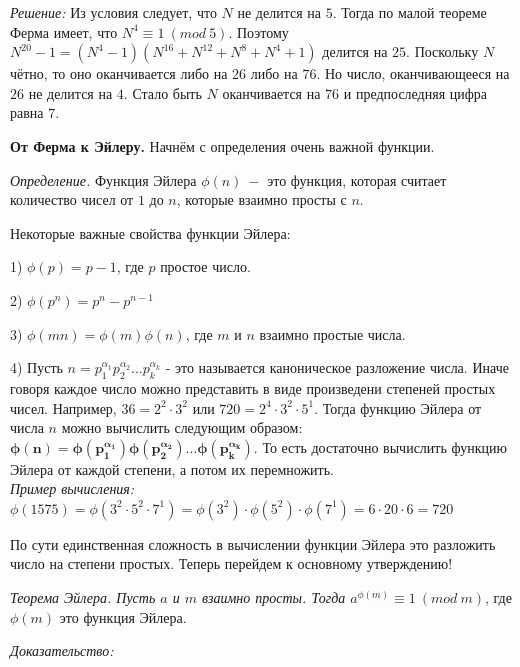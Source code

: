 \par

\textit{Решение:} Из условия следует, что $N$ не делится на $5$. Тогда по малой теореме Ферма имеет, что 
$N^{4} \equiv 1 \ (mod \ 5)$. Поэтому $N^{20} - 1 = (N^{4} - 1)(N^{16}+N^{12}+N^{8}+N^{4}+1)$ делится на $25$. Поскольку $N$ чётно, то оно оканчивается либо на $26$ либо на $76$. Но число, оканчивающееся на $26$ не делится на $4$.
Стало быть $N$ оканчивается на $76$ и предпоследняя цифра равна $7$.

\newpage

\textbf{\Large{От Ферма к Эйлеру.}} Начнём с определения очень важной функции. 

\textit{Определение.} Функция Эйлера $\phi (n) \ - $ это функция, которая считает количество чисел от $1$ до $n$, которые взаимно просты с $n$. 

\par 

Некоторые важные свойства функции Эйлера:

1) $\phi (p) = p-1$, где $p$ простое число.

2) $\phi (p^{n}) = p^{n}- p^{n-1}$ 

3) $\phi (mn) = \phi (m)\phi (n)$, где $m$ и $n$ взаимно простые числа.

4) Пусть $n = p_1^{\alpha_1}p_2^{\alpha_2} \dots p_k^{\alpha_k}$ - это называется каноническое разложение числа. Иначе говоря каждое число можно представить в виде произведени степеней простых чисел. Например, $36 = 2^2 \cdot 3^2$ или $720 = 2^4 \cdot 3^2 \cdot 5^1$. Тогда функцию Эйлера от числа $n$ можно вычислить следующим образом: 
$\boldsymbol{\phi (n) = \phi (p_1^{\alpha_1}) \phi (p_2^{\alpha_2}) \dots \phi (p_k^{\alpha_k})}$. То есть достаточно вычислить функцию Эйлера от каждой степени, а потом их перемножить. \\
\textit{Пример вычисления:}
$\phi (1575) = \phi (3^2 \cdot 5^2 \cdot 7^1) = \phi (3^2) \cdot \phi (5^2) \cdot \phi (7^1) = 6 \cdot 20 \cdot 6 = 720$

По сути единственная сложность в вычислении функции Эйлера это разложить число на степени простых. Теперь перейдем к основному утверждению!

\textit{Теорема Эйлера. Пусть $a$ и $m$ взаимно просты. Тогда $a^{\phi (m)} \equiv 1 \ (mod \ m)$}, где $\phi (m)$ это функция Эйлера.

\par 

\textit{Доказательство:}

